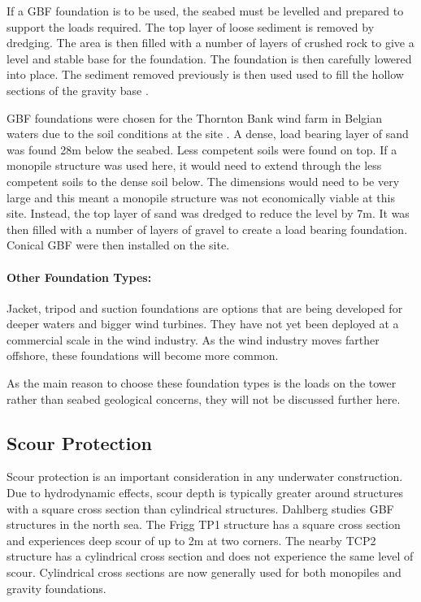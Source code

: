 \documentclass[12pt]{article} %
\begin{document}
If a GBF foundation is to be used, the seabed must be levelled and prepared to support the loads required. The top layer of loose sediment is removed by dredging. The area is then filled with a number of layers of crushed rock to give a level and stable base for the foundation. The foundation is then carefully lowered into place. The sediment removed previously is then used used to fill the hollow sections of the gravity base \cite{ruiz}. 

GBF foundations were chosen for the Thornton Bank wind farm in Belgian waters due to the soil conditions at the site \cite{thornton}. A dense, load bearing layer of sand was found 28m below the seabed. Less competent soils were found on top. If a monopile structure was used here, it would need to extend through the less competent soils to the dense soil below. The dimensions would need to be very large and this meant a monopile structure was not economically viable at this site. Instead, the top layer of sand was dredged to reduce the level by 7m. It was then filled with a number of layers of gravel to create a load bearing foundation. Conical GBF were then installed on the site.

\paragraph{Other Foundation Types:} Jacket, tripod and suction foundations are options that are being developed for deeper waters and bigger wind turbines. They have not yet been deployed at a commercial scale in the wind industry. As the wind industry moves farther offshore, these foundations will become more common. 

As the main reason to choose these foundation types is the loads on the tower rather than seabed geological concerns, they will not be discussed further here.

\subsection{Scour Protection}
Scour protection is an important consideration in any underwater construction.
Due to hydrodynamic effects, scour depth is typically greater around structures with a square cross section than cylindrical structures. Dahlberg \cite{dahlberg} studies GBF structures in the north sea. The Frigg TP1 structure has a square cross section and experiences deep scour of up to 2m at two corners. The nearby TCP2 structure has a cylindrical cross section and does not experience the same level of scour.
Cylindrical cross sections are now generally used for both monopiles and gravity foundations.
\end{document}
